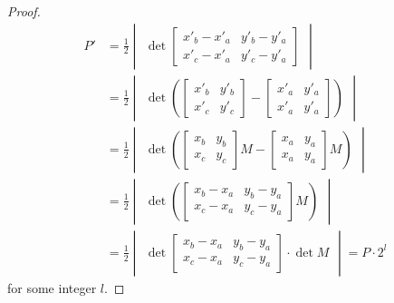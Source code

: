 \documentclass[10pt,a4paper]{amsart}
\begin{document}
\begin{proof}
\begin{align*}
P' &= \frac{1}{2}\begin{vmatrix} \det
 \begin{bmatrix}
 	x'_b-x'_a&y'_b-y'_a\\
 	x'_c-x'_a&y'_c-y'_a
 \end{bmatrix}\end{vmatrix} \\
 &=
\frac{1}{2}\begin{vmatrix} \det\left(
\begin{bmatrix}
	x'_b &y'_b \\
	x'_c &y'_c
\end{bmatrix}- \begin{bmatrix}
 x'_a& y'_a\\
 x'_a& y'_a
\end{bmatrix}\right)\end{vmatrix}\\
&=\frac{1}{2}\begin{vmatrix} \det\left(
\begin{bmatrix}
	x_b &y_b \\
	x_c &y_c
\end{bmatrix}M- \begin{bmatrix}
	x_a& y_a\\
	x_a& y_a
\end{bmatrix}M\right)\end{vmatrix} \\
&=
\frac{1}{2}\begin{vmatrix}\det
	\left(\begin{bmatrix}
		x_b-x_a&y_b-y_a\\
	x_c-x_a&y_c-y_a
\end{bmatrix}
	 M\right)\end{vmatrix}
\\&= \frac{1}{2}\begin{vmatrix} \det
			\begin{bmatrix}
			x_b-x_a&y_b-y_a\\
			x_c-x_a&y_c-y_a
		\end{bmatrix}
	\cdot \det M\end{vmatrix} = P\cdot 2^{l}
\end{align*}
for some integer $l$.
\end{proof}
\end{document}
